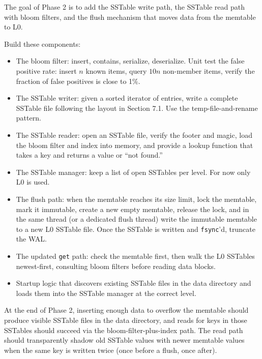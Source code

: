 \documentclass[11pt,a4paper]{article}
\begin{document}
The goal of Phase 2 is to add the SSTable write path, the SSTable read path with bloom filters, and the flush mechanism that moves data from the memtable to L0.

Build these components:

\begin{itemize}
\item The bloom filter: insert, contains, serialize, deserialize. Unit test the false positive rate: insert $n$ known items, query $10n$ non-member items, verify the fraction of false positives is close to 1\%.

\item The SSTable writer: given a sorted iterator of entries, write a complete SSTable file following the layout in Section 7.1. Use the temp-file-and-rename pattern.

\item The SSTable reader: open an SSTable file, verify the footer and magic, load the bloom filter and index into memory, and provide a lookup function that takes a key and returns a value or ``not found.''

\item The SSTable manager: keep a list of open SSTables per level. For now only L0 is used.

\item The flush path: when the memtable reaches its size limit, lock the memtable, mark it immutable, create a new empty memtable, release the lock, and in the same thread (or a dedicated flush thread) write the immutable memtable to a new L0 SSTable file. Once the SSTable is written and \texttt{fsync}'d, truncate the WAL.

\item The updated \texttt{get} path: check the memtable first, then walk the L0 SSTables newest-first, consulting bloom filters before reading data blocks.

\item Startup logic that discovers existing SSTable files in the data directory and loads them into the SSTable manager at the correct level.
\end{itemize}

At the end of Phase 2, inserting enough data to overflow the memtable should produce visible SSTable files in the data directory, and reads for keys in those SSTables should succeed via the bloom-filter-plus-index path. The read path should transparently shadow old SSTable values with newer memtable values when the same key is written twice (once before a flush, once after).
\end{document}
